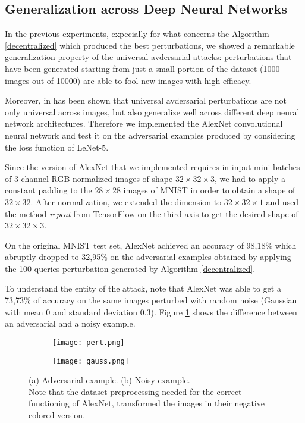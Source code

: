 \subsection{Generalization across Deep Neural Networks}
In the previous experiments, expecially for what concerns the Algorithm \ref{decentralized} which produced the best perturbations, we showed a remarkable generalization property of the universal avdersarial attacks: perturbations that have been generated starting from just a small portion of the dataset (1000 images out of 10000) are able to fool new images with high efficacy.

Moreover, in \cite{A2} has been shown that universal avdersarial perturbations are not only universal across images, but also generalize well across different deep neural network architectures. Therefore we implemented the AlexNet convolutional neural network and test it on the adversarial examples produced by considering the loss function of LeNet-5.

Since the version of AlexNet that we implemented requires in input mini-batches of 3-channel RGB normalized images of shape $32\times 32\times 3$, we had to apply a constant padding to the $28\times 28$ images of MNIST in order to obtain a shape of $32\times 32$. After normalization, we extended the dimension to $32\times 32\times 1$ and used the method \textit{repeat} from TensorFlow on the third axis to get the desired shape of $32\times 32\times 3$. 

On the original MNIST test set, AlexNet achieved an accuracy of 98,18\% which abruptly dropped to 32,95\% on the adversarial examples obtained by applying the 100 queries-perturbation generated by Algorithm \ref{decentralized}.

To understand the entity of the attack, note that AlexNet was able to get a 73,73\% of accuracy on the same images perturbed with random noise (Gaussian with mean 0 and standard deviation 0.3). Figure \ref{fig:gen} shows the difference between an adversarial and a noisy example.

\begin{figure}[h]
	\centering
	\begin{subfigure}[b]{0.15\textwidth}
		\centering
		\texttt{[image: pert.png]}
		\caption{}
	\end{subfigure}
	\hspace{1cm}
	\begin{subfigure}[b]{0.15\textwidth}
		\texttt{[image: gauss.png]}
		\caption{}
	\end{subfigure}
	\caption{{\small (a) Adversarial example. (b) Noisy example.\\ Note that the dataset preprocessing needed for the correct functioning of AlexNet, transformed the images in their negative colored version.}}
	\label{fig:gen}
\end{figure}